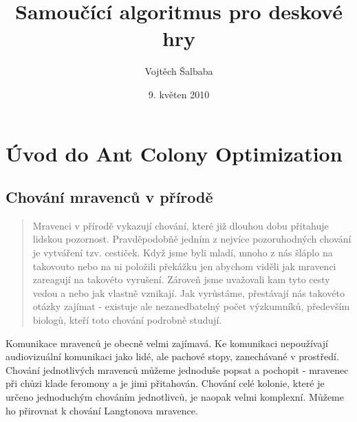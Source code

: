 \documentclass[12pt]{article}
\title{Samoučící algoritmus pro deskové hry}
\author{Vojtěch Šalbaba}
\date{9. květen 2010}
\begin{document}
\maketitle
\newpage

\medskip
\section{Úvod do Ant Colony Optimization}
\subsection{Chování mravenců v přírodě}
\begin{quotation}
Mravenci v přírodě vykazují chování, které již dlouhou dobu přitahuje lidskou pozornost. Pravděpodob\v{n}ě jedním z nejvíce pozoruhodných chování je vytváření tzv. cestiček. Když jsme byli mladí, mnoho z nás šláplo na takovouto  nebo na ni položili překážku jen abychom viděli jak mravenci zareagují na takovéto vyrušení. Zárove\v{n} jsme uvažovali kam tyto cesty vedou a nebo jak vlastně vznikají. Jak vyrůstáme, přestávají nás takovéto otázky zajímat - existuje ale nezanedbatelný počet výzkumníků, především biologů, kteří toto chování podrobně studují. \cite{dorigo2004}
\end{quotation}
Komunikace mravenců je obecně velmi zajímavá. Ke komunikaci nepoužívají audiovizuální komunikaci jako lidé, ale pachové stopy, zanechávané v prostředí. Chování jednotlivých mravenců můžeme jednoduše popsat a pochopit - mravenec při chůzi klade feromony a je jimi přitahován. Chování celé kolonie, které je určeno jednoduchým chováním jednotlivců, je naopak velmi komplexní. Můžeme ho přirovnat k chování Langtonova mravence. 
\end{document}
